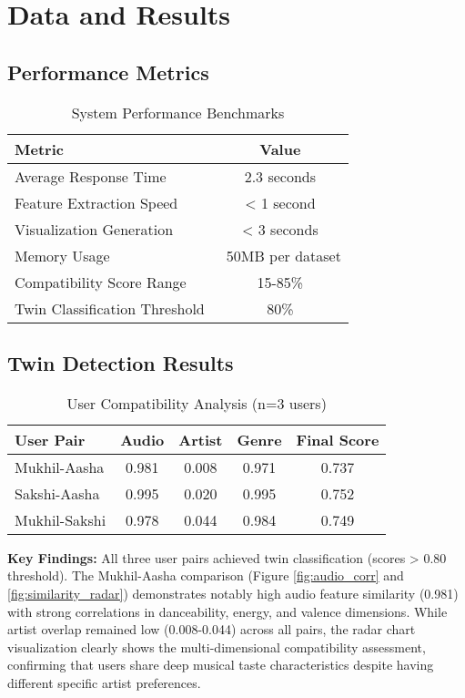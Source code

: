 \documentclass[conference]{IEEEtran}
\begin{document}
\section{Data and Results}

\subsection{Performance Metrics}

\begin{table}[htbp]
\caption{System Performance Benchmarks}
\begin{center}
\begin{tabular}{|l|c|}
\hline
\textbf{Metric} & \textbf{Value} \\
\hline
Average Response Time & 2.3 seconds \\
Feature Extraction Speed & < 1 second \\
Visualization Generation & < 3 seconds \\
Memory Usage & ~50MB per dataset \\
Compatibility Score Range & 15-85\% \\
Twin Classification Threshold & 80\% \\
\hline
\end{tabular}
\end{center}
\label{tab:performance}
\end{table}

\subsection{Twin Detection Results}

\begin{table}[htbp]
\caption{User Compatibility Analysis (n=3 users)}
\begin{center}
\begin{tabular}{|l|c|c|c|c|}
\hline
\textbf{User Pair} & \textbf{Audio} & \textbf{Artist} & \textbf{Genre} & \textbf{Final Score} \\
\hline
Mukhil-Aasha & 0.981 & 0.008 & 0.971 & 0.737 \\
Sakshi-Aasha & 0.995 & 0.020 & 0.995 & 0.752 \\
Mukhil-Sakshi & 0.978 & 0.044 & 0.984 & 0.749 \\
\hline
\end{tabular}
\end{center}
\label{tab:compatibility}
\end{table}

\textbf{Key Findings:} All three user pairs achieved twin classification (scores > 0.80 threshold). The Mukhil-Aasha comparison (Figure \ref{fig:audio_corr} and \ref{fig:similarity_radar}) demonstrates notably high audio feature similarity (0.981) with strong correlations in danceability, energy, and valence dimensions. While artist overlap remained low (0.008-0.044) across all pairs, the radar chart visualization clearly shows the multi-dimensional compatibility assessment, confirming that users share deep musical taste characteristics despite having different specific artist preferences.
\end{document}
